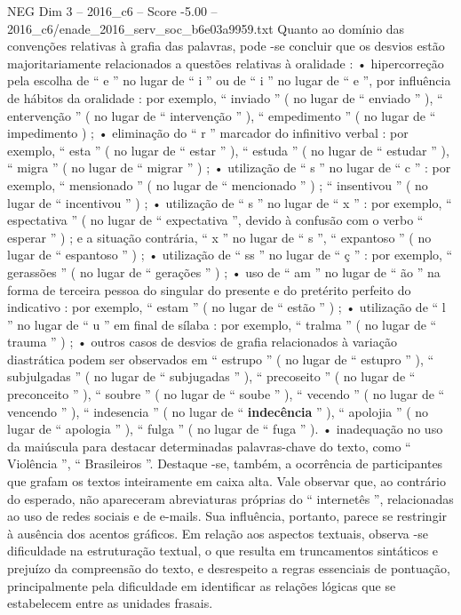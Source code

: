 \begin{textsample}{NEG Dim 3 – 2016\_c6 – Score -5.00 – 2016\_c6/enade\_2016\_serv\_soc\_b6e03a9959.txt}
Quanto ao domínio das convenções relativas à grafia das palavras, pode -se concluir que os desvios estão majoritariamente relacionados a questões relativas à oralidade : • hipercorreção pela escolha de “ e ” no lugar de “ i ” ou de “ i ” no lugar de “ e ”, por influência de hábitos da oralidade : por exemplo, “ inviado ” ( no lugar de “ enviado ” ), “ entervenção ” ( no lugar de “ intervenção ” ), “ empedimento ” ( no lugar de “ impedimento ) ; • eliminação do “ r ” marcador do infinitivo verbal : por exemplo, “ esta ” ( no lugar de “ estar ” ), “ estuda ” ( no lugar de “ estudar ” ), “ migra ” ( no lugar de “ migrar ” ) ; • utilização de “ s ” no lugar de “ c ” : por exemplo, “ mensionado ” ( no lugar de “ mencionado ” ) ; “ insentivou ” ( no lugar de “ incentivou ” ) ; • utilização de “ s ” no lugar de “ x ” : por exemplo, “ espectativa ” ( no lugar de “ expectativa ”, devido à confusão com o verbo “ esperar ” ) ; e a situação contrária, “ x ” no lugar de “ s ”, “ expantoso ” ( no lugar de “ espantoso ” ) ; • utilização de “ ss ” no lugar de “ ç ” : por exemplo, “ gerassões ” ( no lugar de “ gerações ” ) ; • uso de “ am ” no lugar de “ ão ” na forma de terceira pessoa do singular do presente e do pretérito perfeito do indicativo : por exemplo, “ estam ” ( no lugar de “ estão ” ) ; • utilização de “ l ” no lugar de “ u ” em final de sílaba : por exemplo, “ tralma ” ( no lugar de “ trauma ” ) ; • outros casos de desvios de grafia relacionados à variação diastrática podem ser observados em “ estrupo ” ( no lugar de “ estupro ” ), “ subjulgadas ” ( no lugar de “ subjugadas ” ), “ precoseito ” ( no lugar de “ preconceito ” ), “ soubre ” ( no lugar de “ soube ” ), “ vecendo ” ( no lugar de “ vencendo ” ), “ indesencia ” ( no lugar de “ \textbf{indecência} ” ), “ apolojia ” ( no lugar de “ apologia ” ), “ fulga ” ( no lugar de “ fuga ” ). • inadequação no uso da maiúscula para destacar determinadas palavras-chave do texto, como “ Violência ”, “ Brasileiros ”.
Destaque -se, também, a ocorrência de participantes que grafam os textos inteiramente em caixa alta.
Vale observar que, ao contrário do esperado, não apareceram abreviaturas próprias do “ internetês ”, relacionadas ao uso de redes sociais e de e-mails.
Sua influência, portanto, parece se restringir à ausência dos acentos gráficos.
Em relação aos aspectos textuais, observa -se dificuldade na estruturação textual, o que resulta em truncamentos sintáticos e prejuízo da compreensão do texto, e desrespeito a regras essenciais de pontuação, principalmente pela dificuldade em identificar as relações lógicas que se estabelecem entre as unidades frasais.

\end{textsample}
